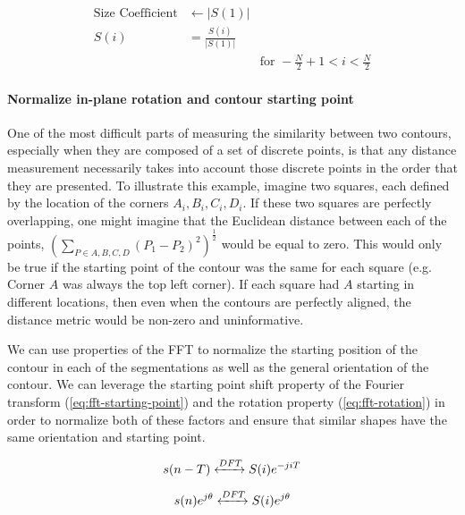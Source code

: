 \begin{equation}
    \begin{aligned}
        \text{Size Coefficient} &\leftarrow |S(1)| \\
        S(i) &= \frac{S(i)}{|S(1)|} & \\
        & & \text{for } -\frac{N}{2} + 1 < i < \frac{N}{2}
    \end{aligned}
\end{equation}


\paragraph*{Normalize in-plane rotation and contour starting point}

One of the most difficult parts of measuring the similarity between two contours, especially when they are composed of a set of discrete points, is that any distance measurement necessarily takes into account those discrete points in the order that they are presented. To illustrate this example, imagine two squares, each defined by the location of the corners $A_i,B_i,C_i,D_i$. If these two squares are perfectly overlapping, one might imagine that the Euclidean distance between each of the points, $(\sum_{P \in A,B,C,D} (P_1 - P_2)^2)^{\frac{1}{2}}$ would be equal to zero. This would only be true if the starting point of the contour was the same for each square (e.g. Corner $A$ was always the top left corner). If each square had $A$ starting in different locations, then even when the contours are perfectly aligned, the distance metric would be non-zero and uninformative. 

We can use properties of the FFT to normalize the starting position of the contour in each of the segmentations as well as the general orientation of the contour. We can leverage the starting point shift property of the Fourier transform (\cref{eq:fft-starting-point}) and the rotation property (\cref{eq:fft-rotation}) in order to normalize both of these factors and ensure that similar shapes have the same orientation and starting point. 

\begin{equation}
    s(n-T) \xleftrightarrow[]{DFT} S(i)e^{-jiT}
    \label{eq:fft-starting-point}
\end{equation}

\begin{equation}
    s(n)e^{j\theta} \xleftrightarrow[]{DFT} S(i)e^{j\theta}
    \label{eq:fft-rotation}
\end{equation}

